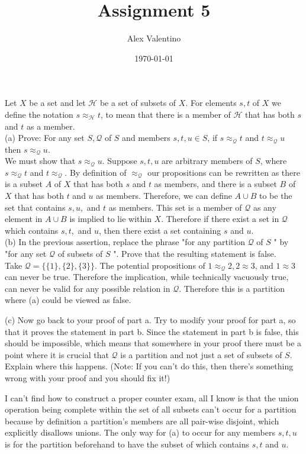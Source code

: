 \documentclass[12pt, letterpaper]{article}
\date{\today}
\author{Alex Valentino}
\title{Assignment 5}
\newcommand{\Q}{\mathcal{Q}}
\begin{document}
	Let $X$ be a set and let $\mathcal{H}$ be a set of subsets of $X$. For elements $s, t$ of $X$ we define the notation $s \approx_{\mathcal{H}} t$, to mean that there is a member of $\mathcal{H}$ that has both $s$ and $t$ as a member.\\
	\newline
(a) Prove: For any set $S, \mathcal{Q}$ of $S$ and members $s, t, u \in S$, if $s \approx_{\mathcal{Q}} t$ and $t \approx_{\mathcal{Q}} u$ then $s \approx_{\mathcal{Q}} u$.\\
We must show that $s \approx_{\mathcal{Q}} u$.  Suppose $s,t,u$ are arbitrary members of $S$, where $s \approx_{\mathcal{Q}} t$ and $t \approx_{\mathcal{Q}}.$ By definition of $\approx_{\Q}$ our propositions can be rewritten as there is a subset $A$ of $X$ that has both $s$ and $t$ as members, and there is a subset $B$ of $X$ that has both $t$ and $u$ as members. Therefore, we can define $A \cup B$ to be the set that contains $s, u, $ and $t$ as members.  This set is a member of $\Q$ as any element in $A \cup B$ is implied to lie within $X$.  Therefore if there exist a set in $\Q$ which contains $s,t,$ and $u$, then there exist a set containing $s$ and $u$.\\  


(b) In the previous assertion, replace the phrase "for any partition $\mathcal{Q}$ of $S$ " by "for any set $\mathcal{Q}$ of subsets of $S$ ". Prove that the resulting statement is false.\\
Take $\Q = \{\{1\},\{2\},\{3\}\}$.  The potential propositions of $1 \approx_\Q 2, 2 \approx 3$, and $1 \approx 3$  can never be true.  Therefore the implication, while technically vacuously true, can never be valid for any possible relation in $\Q$.  Therefore this is a partition where (a) could be viewed as false.  

(c) Now go back to your proof of part a. Try to modify your proof for part a, so that it proves the statement in part b. Since the statement in part b is false, this should be impossible, which means that somewhere in your proof there must be a point where it is crucial that $\mathcal{Q}$ is a partition and not just a set of subsets of $S$. Explain where this happens. (Note: If you can't do this, then there's something wrong with your proof and you should fix it!)

I can't find how to construct a proper counter exam, all I know is that the union operation being complete within the set of all subsets can't occur for a partition because by definition a partition's members are all pair-wise disjoint, which explicitly disallows unions.  The only way for (a) to occur for any members $s,t,u$ is for the partition beforehand to have the subset of which contains $s,t$ and $u$.  
\end{document}
